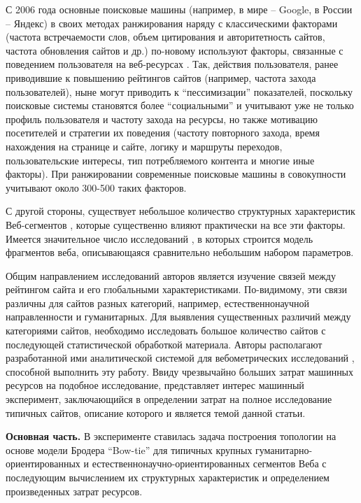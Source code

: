 С 2006 года основные поисковые машины (например, в мире -- Google, в России -- Яндекс) в своих методах ранжирования наряду с классическими факторами \cite{Kleinberg, BrinPage, Chakrabarti} (частота встречаемости слов, объем цитирования и авторитетность сайтов, частота обновления сайтов и др.) по-новому используют факторы, связанные с поведением пользователя на веб-ресурсах \cite{GuhaKunduBhadra,AntoniouPlegasTsakalidis,FeuerSavevAslam}. Так, действия пользователя, ранее приводившие к повышению рейтингов сайтов (например, частота захода пользователей), ныне могут приводить к “пессимизации” показателей, поскольку поисковые системы становятся более “социальными” и учитывают уже не только профиль пользователя и частоту захода на ресурсы, но также мотивацию посетителей и стратегии их поведения (частоту повторного захода, время нахождения на странице и сайте, логику и маршруты переходов, пользовательские интересы, тип потребляемого контента и многие иные факторы). При ранжировании современные поисковые машины в совокупности учитывают около 300-500 таких факторов.

С другой стороны, существует небольшое количество структурных характеристик Веб-сегментов \cite{ChoRoy}, которые существенно влияют практически на все эти факторы. Имеется значительное число исследований \cite{Kleinberg,ChoRoy,BroderKumarMaghoul,AguilloGranadinoOrtega,StuartThelwallHarries,Chakrabarti,Thelwall,Pechnikov,PechnikovNwohiri}, в которых строится модель фрагментов веба, описывающаяся сравнительно небольшим набором параметров.

Общим направлением исследований авторов является изучение связей между рейтингом сайта и его глобальными характеристиками. По-видимому, эти связи различны для сайтов разных категорий, например, естественнонаучной направленности и гуманитарных. Для выявления существенных различий между категориями сайтов, необходимо исследовать большое количество сайтов с последующей статистической обработкой материала. Авторы располагают разработанной ими аналитической системой для вебометрических исследований \cite{BlekanovSergeevMaksimov,BlekanovSergeevMartynenko}, способной выполнить эту работу. Ввиду чрезвычайно больших затрат машинных ресурсов на подобное исследование, представляет интерес машинный эксперимент, заключающийся в определении затрат на полное исследование типичных сайтов, описание которого и является темой данной статьи.

\textbf{Основная часть.} В эксперименте ставилась задача построения топологии на основе модели Бродера “Bow-tie” \cite{BroderKumarMaghoul,Thelwall} для типичных крупных гуманитарно-ориентированных и естественнонаучно-ориентированных сегментов Веба с последующим вычислением их структурных характеристик и определением произведенных затрат ресурсов.

